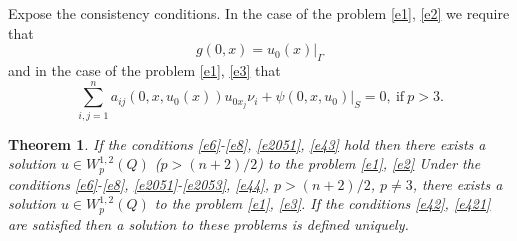 \documentclass{article}
\theoremstyle{plain}
\newtheorem{theorem}{Theorem}
\begin{document}
Expose the consistency  conditions.
In the case of the problem  {\rm \eqref{e1}, \eqref{e2}} we require that 
\begin{equation}\label{e43}
g(0,x)=u_0(x)|_\Gamma
\end{equation}
and in the case of the problem  {\rm \eqref{e1}, \eqref{e3}} that   
\begin{equation}\label{e44}
 \sum_{i,j=1}^na_{ij}(0,x,u_0(x))u_{0x_j}\nu_i+ \psi(0,x,u_0)|_{S}=0,\  \textrm{if}\  p>3.
\end{equation}

\begin{theorem} \label{thr6}
 If the conditions 
   {\rm \eqref{e6}-\eqref{e8}, \eqref{e2051}, \eqref{e43}} hold then there exists a solution 
       $u\in W_p^{1,2}(Q)$ ($p>(n+2)/2$) to the problem  {\rm \eqref{e1}, \eqref{e2}}
       Under the conditions  {\rm \eqref{e6}-\eqref{e8}, \eqref{e2051}-\eqref{e2053}, \eqref{e44}},  $p>(n+2)/2$, $p\neq 3$, there exists a solution $u\in W_p^{1,2}(Q)$ to the problem 
         {\rm \eqref{e1}, \eqref{e3}}.    
If the conditions  \eqref{e42}, \eqref{e421} are satisfied then a solution to these problems is defined  uniquely.   
 \end{theorem}
 
\end{document}

